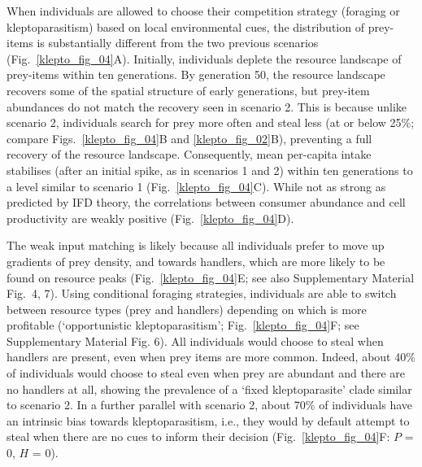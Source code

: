When individuals are allowed to choose their competition strategy (foraging or kleptoparasitism) based on local environmental cues, the distribution of prey-items is substantially different from the two previous scenarios (Fig.~\ref{klepto_fig_04}A).
Initially, individuals deplete the resource landscape of prey-items within ten generations.
By generation 50, the resource landscape recovers some of the spatial structure of early generations, but prey-item abundances do not match the recovery seen in scenario 2.
This is because unlike scenario 2, individuals search for prey more often and steal less (at or below 25\%; compare Figs.~\ref{klepto_fig_04}B and \ref{klepto_fig_02}B), preventing a full recovery of the resource landscape.
Consequently, mean per-capita intake stabilises (after an initial spike, as in scenarios 1 and 2) within ten generations to a level similar to scenario 1 (Fig.~\ref{klepto_fig_04}C).
While not as strong as predicted by IFD theory, the correlations between consumer abundance and cell productivity are weakly positive (Fig.~\ref{klepto_fig_04}D).

The weak input matching is likely because all individuals prefer to move up gradients of prey density, and towards handlers, which are more likely to be found on resource peaks (Fig.~\ref{klepto_fig_04}E; see also Supplementary Material Fig.~4, 7).
Using conditional foraging strategies, individuals are able to switch between resource types (prey and handlers) depending on which is more profitable \citep{emlen1966} (`opportunistic kleptoparasitism'; Fig.~\ref{klepto_fig_04}F; see Supplementary Material Fig. 6).
All individuals would choose to steal when handlers are present, even when prey items are more common.
Indeed, about 40\% of individuals would choose to steal even when prey are abundant and there are no handlers at all, showing the prevalence of a `fixed kleptoparasite' clade similar to scenario 2.
In a further parallel with scenario 2, about 70\% of individuals have an intrinsic bias towards kleptoparasitism, i.e., they would by default attempt to steal when there are no cues to inform their decision (Fig.~\ref{klepto_fig_04}F: $P$ = 0, $H$ = 0).

